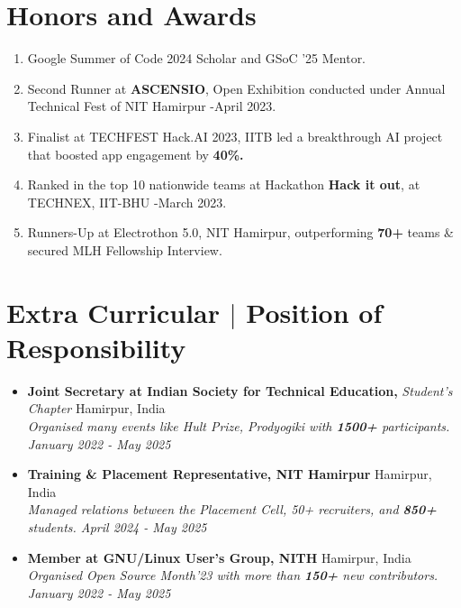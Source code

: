 \documentclass[7pt, legalpaper]{article}
\begin{document}
\section{Honors and Awards}
\begin{enumerate}[leftmargin=*, itemsep=0em]
    \item Google Summer of Code 2024 Scholar and GSoC '25 Mentor.
    \item Second Runner at \textbf{ASCENSIO}, Open Exhibition conducted under Annual Technical Fest of NIT Hamirpur -April 2023.
    \item Finalist at TECHFEST Hack.AI 2023, IITB led a breakthrough AI project that boosted app engagement by \textbf{40\%.}
    \item Ranked in the top 10 nationwide teams at Hackathon \textbf{Hack it out}, at TECHNEX, IIT-BHU -March 2023.
    \item Runners-Up at Electrothon 5.0, NIT Hamirpur, outperforming \textbf{70+} teams \& secured MLH Fellowship Interview.
\end{enumerate}

\section{Extra Curricular $|$ \normalsize{Position of Responsibility}}

\begin{itemize}[leftmargin=*, itemsep=0em]
    \item \normalsize{\textbf {Joint Secretary at Indian Society for Technical Education,} \textit{Student's Chapter} \hfill Hamirpur, India}\\
    \small \textit {Organised many events like Hult Prize, Prodyogiki with \textbf{1500+} participants. \hfill January 2022 - May 2025}
    
    \item \normalsize{\textbf {Training \& Placement Representative, NIT Hamirpur} \hfill Hamirpur, India}\\
    \small \textit{ Managed relations between the Placement Cell, 50+ recruiters, and \textbf{850+} students. \hfill April 2024 - May 2025}
    
    \item  \normalsize{\textbf{Member at GNU/Linux User's Group, NITH} \hfill Hamirpur, India}\\
    \small \textit {Organised Open Source Month'23 with more than \textbf{150+} new contributors. \hfill January 2022 - May 2025}
\end{itemize}
\end{document}
